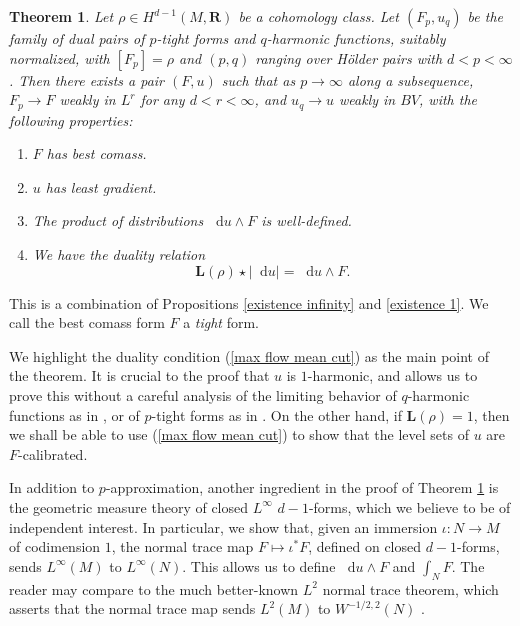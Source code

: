 \documentclass[reqno,11pt]{amsart}
\newcommand{\RR}{\mathbf{R}}
\newcommand*\dif{\mathop{}\!\mathrm{d}}
\newcommand{\Comass}{\mathbf L}
\newcommand{\dfn}[1]{\emph{#1}\index{#1}}
\newtheorem{mainthm}{Theorem}
\theoremstyle{definition}
\numberwithin{equation}{section}
\begin{document}
\begin{mainthm}\label{existence of infinity tight forms}
Let $\rho \in H^{d - 1}(M, \RR)$ be a cohomology class.
Let $(F_p, u_q)$ be the family of dual pairs of $p$-tight forms and $q$-harmonic functions, suitably normalized, with $[F_p] = \rho$ and $(p, q)$ ranging over H\"older pairs with $d < p < \infty$.
Then there exists a pair $(F, u)$ such that as $p \to \infty$ along a subsequence, $F_p \to F$ weakly in $L^r$ for any $d < r < \infty$, and $u_q \to u$ weakly in $BV$, with the following properties:
\begin{enumerate}
\item $F$ has best comass.
\item $u$ has least gradient.
\item The product of distributions $\dif u \wedge F$ is well-defined.
\item We have the duality relation
\begin{equation}\label{max flow mean cut}
\Comass(\rho) \star |\dif u| = \dif u \wedge F.
\end{equation}
\end{enumerate}
\end{mainthm}

This is a combination of Propositions \ref{existence infinity} and \ref{existence 1}.
We call the best comass form $F$ a \dfn{tight} form.

We highlight the duality condition (\ref{max flow mean cut}) as the main point of the theorem.
It is crucial to the proof that $u$ is $1$-harmonic, and allows us to prove this without a careful analysis of the limiting behavior of $q$-harmonic functions as in \cite[Theorem 2.4]{Mazon14}, or of $p$-tight forms as in \cite[\S6]{daskalopoulos2020transverse}.
On the other hand, if $\Comass(\rho) = 1$, then we shall be able to use (\ref{max flow mean cut}) to show that the level sets of $u$ are $F$-calibrated.

In addition to $p$-approximation, another ingredient in the proof of Theorem \ref{existence of infinity tight forms} is the geometric measure theory of closed $L^\infty$ $d - 1$-forms, which we believe to be of independent interest. 
In particular, we show that, given an immersion $\iota: N \to M$ of codimension $1$, the normal trace map $F \mapsto \iota^* F$, defined on closed $d - 1$-forms, sends $L^\infty(M)$ to $L^\infty(N)$.
This allows us to define $\dif u \wedge F$ and $\int_N F$.
The reader may compare to the much better-known $L^2$ normal trace theorem, which asserts that the normal trace map sends $L^2(M)$ to $W^{-1/2, 2}(N)$ \cite[Chapter 2]{cessenat1996mathematical}.
\end{document}
